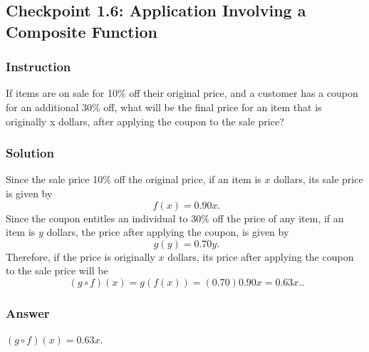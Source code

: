 \subsection*{Checkpoint 1.6: Application Involving a Composite Function}

\subsubsection{Instruction}

If items are on sale for 10\% off their original price, and a customer has a coupon for an additional 30\% off, what will be the final price for an item that is originally x dollars, after applying the coupon to the sale price?

\subsubsection{Solution}

Since the sale price 10\% off the original price, if an item is $ x $ dollars, its sale price is given by
$$ \phantom{.}
f(x) = 0.90x
.$$
Since the coupon entitles an individual to 30\% off the price of any item, if an item is $ y $ dollars, the price after applying the coupon, is given by
$$ \phantom{.}
g(y) = 0.70y
.$$
Therefore, if the price is originally $ x $ dollars, its price after applying the coupon to the sale price will be
$$ \phantom{.}
(g \circ f)(x) = g(f(x)) = (0.70)0.90x = 0.63x.
.$$

\subsubsection{Answer}

$ (g \circ f)(x) = 0.63x $.
